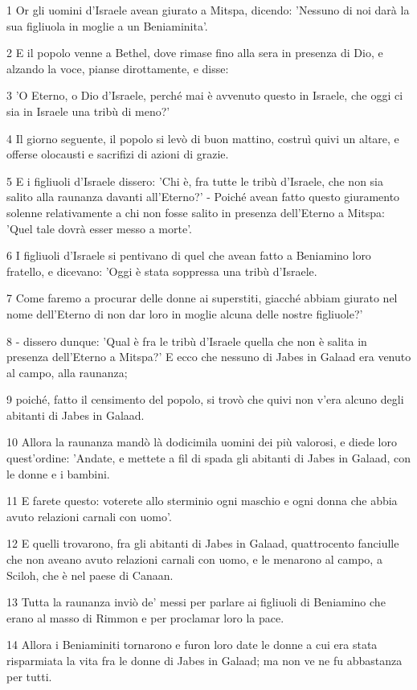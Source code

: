 \par 1 Or gli uomini d'Israele avean giurato a Mitspa, dicendo: 'Nessuno di noi darà la sua figliuola in moglie a un Beniaminita'.
\par 2 E il popolo venne a Bethel, dove rimase fino alla sera in presenza di Dio, e alzando la voce, pianse dirottamente, e disse:
\par 3 'O Eterno, o Dio d'Israele, perché mai è avvenuto questo in Israele, che oggi ci sia in Israele una tribù di meno?'
\par 4 Il giorno seguente, il popolo si levò di buon mattino, costruì quivi un altare, e offerse olocausti e sacrifizi di azioni di grazie.
\par 5 E i figliuoli d'Israele dissero: 'Chi è, fra tutte le tribù d'Israele, che non sia salito alla raunanza davanti all'Eterno?' - Poiché avean fatto questo giuramento solenne relativamente a chi non fosse salito in presenza dell'Eterno a Mitspa: 'Quel tale dovrà esser messo a morte'.
\par 6 I figliuoli d'Israele si pentivano di quel che avean fatto a Beniamino loro fratello, e dicevano: 'Oggi è stata soppressa una tribù d'Israele.
\par 7 Come faremo a procurar delle donne ai superstiti, giacché abbiam giurato nel nome dell'Eterno di non dar loro in moglie alcuna delle nostre figliuole?'
\par 8 - dissero dunque: 'Qual è fra le tribù d'Israele quella che non è salita in presenza dell'Eterno a Mitspa?' E ecco che nessuno di Jabes in Galaad era venuto al campo, alla raunanza;
\par 9 poiché, fatto il censimento del popolo, si trovò che quivi non v'era alcuno degli abitanti di Jabes in Galaad.
\par 10 Allora la raunanza mandò là dodicimila uomini dei più valorosi, e diede loro quest'ordine: 'Andate, e mettete a fil di spada gli abitanti di Jabes in Galaad, con le donne e i bambini.
\par 11 E farete questo: voterete allo sterminio ogni maschio e ogni donna che abbia avuto relazioni carnali con uomo'.
\par 12 E quelli trovarono, fra gli abitanti di Jabes in Galaad, quattrocento fanciulle che non aveano avuto relazioni carnali con uomo, e le menarono al campo, a Sciloh, che è nel paese di Canaan.
\par 13 Tutta la raunanza inviò de' messi per parlare ai figliuoli di Beniamino che erano al masso di Rimmon e per proclamar loro la pace.
\par 14 Allora i Beniaminiti tornarono e furon loro date le donne a cui era stata risparmiata la vita fra le donne di Jabes in Galaad; ma non ve ne fu abbastanza per tutti.
